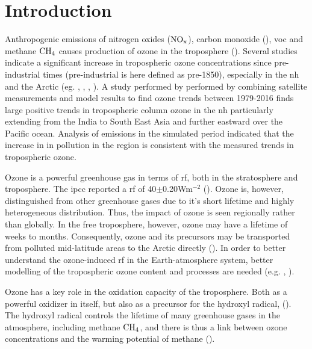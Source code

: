 \chapter{Introduction} \label{ch:introduction}
Anthropogenic emissions of nitrogen oxides ($\mathrm{NO_x}$), carbon monoxide (), \acrfull{voc} and methane $\mathrm{CH_4}$ causes production of ozone in the troposphere (\cite{SeinfeldSpyros}). Several studies indicate a significant increase in tropospheric ozone concentrations since pre-industrial times (pre-industrial is here defined as pre-1850), especially in the \acrfull{nh} and the Arctic (eg. \cite{WangJacob1998}, \cite{Shindell2007}, \cite{Parrish2014}, \cite{AMAP2015}). A study performed by \cite{ZIEMKE2019} performed by combining satellite measurements and model results to find ozone trends between 1979-2016 finds large positive trends in tropospheric column ozone in the \acrshort{nh} particularly extending from the India to South East Asia and further eastward over the Pacific ocean. Analysis of  emissions in the simulated period indicated that the increase in in pollution in the region is consistent with the measured trends in tropospheric ozone.  

\medskip

Ozone is a powerful greenhouse gas in terms of \acrfull{rf}, both in the stratosphere and troposphere. The \acrfull{ipcc} reported a \acrshort{rf} of 40$\pm$0.20Wm$^{-2}$ (\cite{IPCCchapter8}). Ozone is, however, distinguished from other greenhouse gases due to it's short lifetime and highly heterogeneous distribution. Thus, the impact of ozone is seen regionally rather than globally. In the free troposphere, however, ozone may have a lifetime of weeks to months. Consequently, ozone and its precursors may be transported from polluted mid-latitude areas to the Arctic directly (\cite{AMAP2015}). In order to better understand the ozone-induced \acrshort{rf} in the Earth-atmosphere system, better modelling of the tropospheric ozone content and processes are needed (e.g. \cite{Bowman2013}, \cite{Parella}). 

\medskip

Ozone has a key role in the oxidation capacity of the troposphere. Both as a powerful oxidizer in itself, but also as a precursor for the hydroxyl radical,  (\cite{WangJacob1998}). The hydroxyl radical controls the lifetime of many greenhouse gases in the atmosphere, including methane $\mathrm{CH_4}$, and there is thus a link between ozone concentrations and the warming potential of methane (\cite{Levy1971}). 

